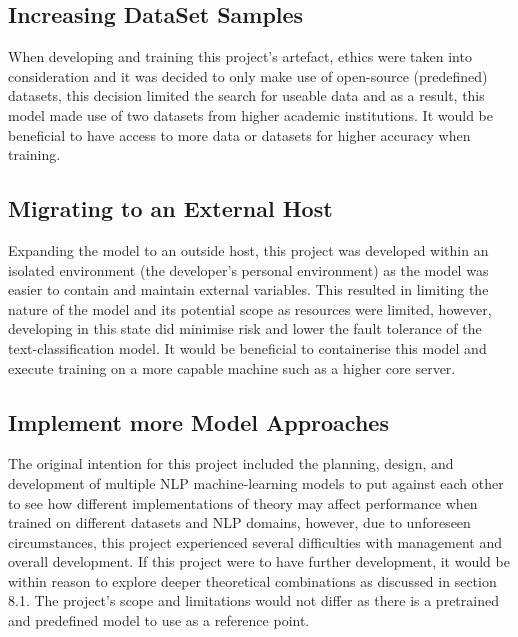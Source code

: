 \subsection{Increasing DataSet Samples}
When developing and training this project’s artefact, ethics were taken into consideration and it was decided to only make use of open-source (predefined) datasets, this decision limited the search for useable data and as a result, this model made use of two datasets from higher academic institutions. It would be beneficial to have access to more data or datasets for higher accuracy when training.

\subsection{Migrating to an External Host}
Expanding the model to an outside host, this project was developed within an isolated environment (the developer’s personal environment) as the model was easier to contain and maintain external variables. This resulted in limiting the nature of the model and its potential scope as resources were limited, however, developing in this state did minimise risk and lower the fault tolerance of the text-classification model. It would be beneficial to containerise this model and execute training on a more capable machine such as a higher core server.

\subsection{Implement more Model Approaches}
The original intention for this project included the planning, design, and development of multiple NLP machine-learning models to put against each other to see how different implementations of theory may affect performance when trained on different datasets and NLP domains, however, due to unforeseen circumstances, this project experienced several difficulties with management and overall development. If this project were to have further development, it would be within reason to explore deeper theoretical combinations as discussed in section 8.1. The project’s scope and limitations would not differ as there is a pretrained and predefined model to use as a reference point.
